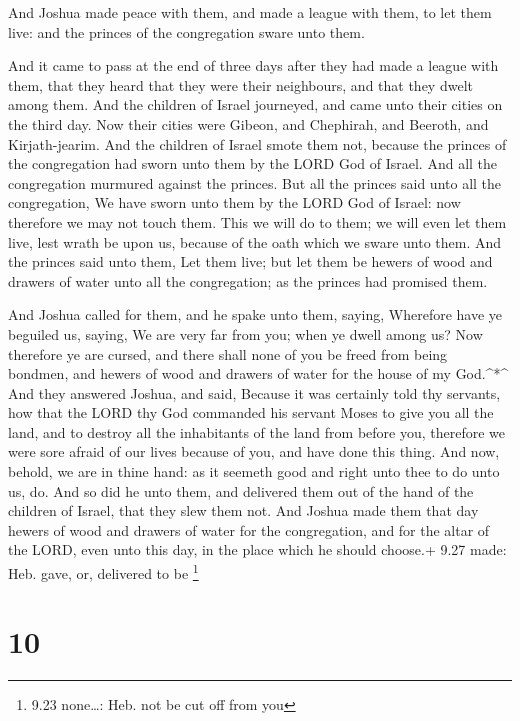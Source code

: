  And Joshua made peace with them, and made a league with
them, to let them live: and the princes of the congregation sware unto
them.

 And it came to pass at the end of three days after they
had made a league with them, that they heard that they were their
neighbours, and that they dwelt among them.  And the
children of Israel journeyed, and came unto their cities on the third
day. Now their cities were Gibeon, and Chephirah, and Beeroth, and
Kirjath-jearim.  And the children of Israel smote them not,
because the princes of the congregation had sworn unto them by the LORD
God of Israel. And all the congregation murmured against the princes.
 But all the princes said unto all the congregation, We
have sworn unto them by the LORD God of Israel: now therefore we may not
touch them.  This we will do to them; we will even let them
live, lest wrath be upon us, because of the oath which we sware unto
them.  And the princes said unto them, Let them live; but
let them be hewers of wood and drawers of water unto all the
congregation; as the princes had promised them.

 And Joshua called for them, and he spake unto them,
saying, Wherefore have ye beguiled us, saying, We are very far from you;
when ye dwell among us?  Now therefore ye are cursed, and
there shall none of you be freed from being bondmen, and hewers of wood
and drawers of water for the house of my God.\^{}*\^{}  And
they answered Joshua, and said, Because it was certainly told thy
servants, how that the LORD thy God commanded his servant Moses to give
you all the land, and to destroy all the inhabitants of the land from
before you, therefore we were sore afraid of our lives because of you,
and have done this thing.  And now, behold, we are in thine
hand: as it seemeth good and right unto thee to do unto us, do.
 And so did he unto them, and delivered them out of the
hand of the children of Israel, that they slew them not. 
And Joshua made them that day hewers of wood and drawers of water for
the congregation, and for the altar of the LORD, even unto this day, in
the place which he should choose.+ 9.27 made: Heb. gave, or, delivered
to be \footnote{9.23 none\ldots: Heb. not be cut off from you}

\hypertarget{section-9}{%
\section{10}\label{section-9}}

